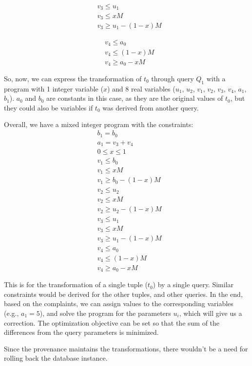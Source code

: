 \documentclass{article}
\begin{document}
\begin{minipage}{0.7\textwidth}
    \begin{minipage}[t]{0.2\textwidth}
        \begin{align*}
            &v_3\le u_1\\
            &v_3\le xM\\
            &v_3\ge u_1 - (1-x)M
        \end{align*}
    \end{minipage}
    \hspace{4em}
    \begin{minipage}[t]{0.2\textwidth}
        \begin{align*}
            &v_4\le a_0\\
            &v_4\le (1-x)M\\
            &v_4\ge a_0 - xM
        \end{align*}
    \end{minipage}
\end{minipage}

So, now, we can express the transformation of $t_0$ through query $Q_1$ with a
program with 1 integer variable ($x$) and 8 real variables ($u_1$, $u_2$,
$v_1$, $v_2$, $v_3$, $v_4$, $a_1$, $b_1$). $a_0$ and $b_0$ are constants in
this case, as they are the original values of $t_0$, but they could also be
variables if $t_0$ was derived from another query.

Overall, we have a mixed integer program with the constraints:
\begin{align*}
    &b_1=b_0\\
    &a_1 = v_3+v_4\\
    &0\leq x\leq 1\\
    &v_1\le b_0\\
    &v_1\le xM\\
    &v_1\ge b_0 - (1-x)M\\
    &v_2\le u_2\\
    &v_2\le xM\\
    &v_2\ge u_2 - (1-x)M\\
    &v_3\le u_1\\
    &v_3\le xM\\
    &v_3\ge u_1 - (1-x)M\\
    &v_4\le a_0\\
    &v_4\le (1-x)M\\
    &v_4\ge a_0 - xM
\end{align*}

\smallskip 

This is for the transformation of a single tuple ($t_0$) by a single query.
Similar constraints would be derived for the other tuples, and other queries.
In the end, based on the complaints, we can assign values to the corresponding
variables (e.g., $a_1=5$), and solve the program for the parameters $u_i$,
which will give us a correction. The optimization objective can be set so that
the sum of the differences from the query parameters is minimized.

\smallskip

Since the provenance maintains the transformations, there wouldn't be a need
for rolling back the database instance.
\end{document}
